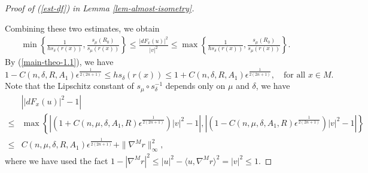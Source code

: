 \documentclass{amsart}
\numberwithin{equation}{section}
\theoremstyle{remark}
\renewcommand{\(}{\left(}
\renewcommand{\)}{\right)}
\renewcommand{\~}{\tilde}
\renewcommand{\-}{\overline}
\renewcommand{\d}{\delta}
\newcommand{\e}{\epsilon}
\begin{document}
\begin{proof}[Proof of (\ref{est-df}) in Lemma \ref{lem-almost-isometry}]
\begin{enumerate}[(1)]
	\end{enumerate}
	Combining these two estimates, we obtain
	\begin{align*}
	\min \left\{\frac{1}{h s_\d(r(x))},\frac{ s_\mu(R_0)}{ s_\mu(r(x))} \right\}\leq \frac{|dF_x(u)|^2}{|v|^2} \leq \max \left\{\frac{1}{h s_\d(r(x))},\frac{ s_\mu(R_0)}{ s_\mu(r(x))} \right\}.
	\end{align*}
	By (\ref{main-theo-1.1}), we have
	$$
	1-C(n,\d,R,A_1)\e^{\frac{1}{2(2n+1)}} \leq h s_\d (r(x)) \leq 1+C(n,\d,R,A_1)\e^{\frac{1}{2(2n+1)}}, \quad \text{for all $x\in M$}.
	$$
	Note that the Lipschitz constant of $s_\mu\circ s_\d^{-1}$ depends only on $\mu$ and $\d$, we have
	\begin{align*}
	&\left| |dF_x(u)|^2-1 \right| \\
	\leq &\max\left\{ \left|\(1+C(n,\mu,\d,A_1,R)\e^\frac{1}{2(2n+1)}\)|v|^2-1\right|,\left|\(1-C(n,\mu,\d,A_1,R)\e^\frac{1}{2(2n+1)}\)|v|^2-1\right| \right\}\\
	\leq &C(n,\mu,\d,R,A_1)\e^\frac{1}{2(2n+1)}+\|\nabla^M r\|_\infty^2,
	\end{align*}
	where we have used the fact $1-|\nabla^M r|^2 \leq |u|^2-\langle u,\nabla^M r \rangle^2=|v|^2 \leq 1$.
\end{proof}
\end{document}

